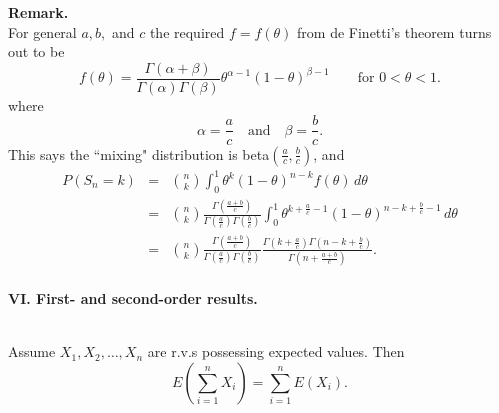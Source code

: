 \documentclass[12pt]{article}
\begin{document}
\newpage


\noindent \textbf{Remark.
} \\
For general $a, b, $ and $c$ the required $f = f(\theta)$ from de Finetti's theorem turns out to be
\begin{equation*}
   f(\theta)= \frac{\Gamma(\alpha + \beta)}{\Gamma(\alpha) \Gamma(\beta)} \theta^{\alpha - 1} (1 - \theta)^{\beta - 1} \quad\quad \text{for } 0 < \theta < 1.
\end{equation*}
where
$$\alpha = \frac{a}{c} \quad \text{and} \quad \beta = \frac{b}{c}.$$
This says the ``mixing" distribution is beta$\left(\frac{a}{c}, \frac{b}{c}\right)$, and
\begin{eqnarray*}
    P(S_n = k) &=& \binom{n}{k} \int_0^1 \theta^k(1-\theta)^{n-k}f(\theta) \,d\theta \\
    &=& \binom{n}{k} \frac{\Gamma(\frac{a+b}{c})}{\Gamma(\frac{a}{c}) \Gamma(\frac{b}{c})}\int_0^1 \theta^{k+\frac{a}{c}-1}(1-\theta)^{n-k+\frac{b}{c}-1} \,d\theta \\
    &=& \binom{n}{k} \frac{\Gamma(\frac{a+b}{c})}{\Gamma(\frac{a}{c}) \Gamma(\frac{b}{c})}\frac {\Gamma(k+\frac{a}{c})\Gamma(n-k+\frac{b}{c})}{\Gamma(n+\frac {a+b}{c})}. \\
\end{eqnarray*}




\newpage

\begin{center}{\bf \Large VI. First- and second-order results.}\end{center}

\newpage




\label{linearityofexpectation}\\


\noindent Assume $X_1, X_2, \dots, X_n$ are r.v.s possessing expected values. Then
\begin{equation*}
    E\left(\sum_{i=1}^n X_i\right) = \sum_{i=1}^n E(X_i).
\end{equation*}
\end{document}
